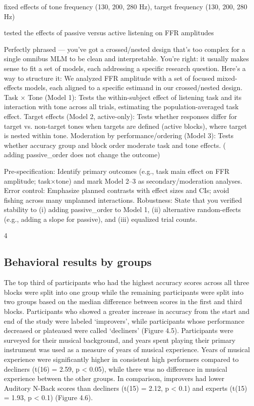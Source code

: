fixed effects of tone frequency (130, 200, 280 Hz), target frequency (130, 200, 280 Hz)

tested the effects of passive versus active listening on FFR amplitudes

Perfectly phrased — you’ve got a crossed/nested design that’s too complex for a single omnibus MLM to be clean and interpretable. You’re right: it usually makes sense to fit a set of models, each addressing a specific research question. Here’s a way to structure it:
We analyzed FFR amplitude with a set of focused mixed-effects models, each aligned to a specific estimand in our crossed/nested design.
Task × Tone (Model 1): Tests the within-subject effect of listening task and its interaction with tone across all trials, estimating the population-averaged task effect.
Target effects (Model 2, active-only): Tests whether responses differ for target vs. non-target tones when targets are defined (active blocks), where target is nested within tone.
Moderation by performance/ordering (Model 3): Tests whether accuracy group and block order moderate task and tone effects. (\\adding passive_order does not change the outcome)

Pre-specification: Identify primary outcomes (e.g., task main effect on FFR amplitude; task×tone) and mark Model 2–3 as secondary/moderation analyses.
Error control: Emphasize planned contrasts with effect sizes and CIs; avoid fishing across many unplanned interactions.
Robustness: State that you verified stability to (i) adding passive_order to Model 1, (ii) alternative random-effects (e.g., adding a slope for passive), and (iii) equalized trial counts.

4

\subsection*{Behavioral results by groups}
The top third of participants who had the highest accuracy scores across all three blocks were split into one group while the remaining participants were split into two groups based on the median difference between scores in the first and third blocks. Participants who showed a greater increase in accuracy from the start and end of the study were labeled ‘improvers’, while participants whose performance decreased or plateaued were called ‘decliners’ (Figure 4.5). Participants were surveyed for their musical background, and years spent playing their primary instrument was used as a measure of years of musical experience. Years of musical experience were significantly higher in consistent high performers compared to decliners (t(16) = 2.59, p < 0.05), while there was no difference in musical experience between the other groups. In comparison, improvers had lower Auditory N-Back scores than decliners (t(15) = 2.12, p < 0.1) and experts (t(15) = 1.93, p < 0.1) (Figure 4.6).

